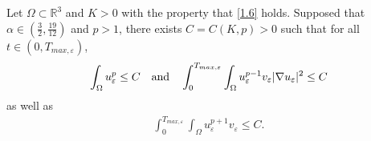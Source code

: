 \documentclass[10pt,a4paper]{amsart}
\begin{document}
\begin{lemma}\label{lemma3.8}
Let $\Omega \subset \mathbb R^3$ and $K>0$ with the property that \eqref{1.6} holds. Supposed that
$\alpha\in\left(\frac{3}{2},\frac{19}{12}\right)$  and $p>1$, there exists  $C=C( K, p)>0$ such that for all
 $ t\in (0,T_{max,\varepsilon})$,
\begin{align}\label{3.30}
   \int_{\Omega}u_{\varepsilon}^{p}\leq C\quad \hbox{and}\quad
   \int_0^{T_{max,\varepsilon}}\int_{\Omega}u_{\varepsilon}^{p-1}v_{\varepsilon}|\nabla u_{\varepsilon}|^2\leq C
\end{align}
as well as
\begin{align}\label{3.30-1}
   \int_0^{T_{max,\varepsilon}}\int_{\Omega}u_{\varepsilon}^{p+1}v_{\varepsilon}\leq C.
\end{align}
\end{lemma}
\end{document}
